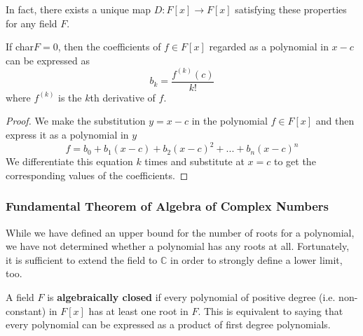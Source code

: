 \documentclass{article}
\begin{document}
      In fact, there exists a unique map $D: F[x] \longrightarrow F[x]$ satisfying these properties for any field $F$. 

      \begin{proposition}
        If char$F = 0$, then the coefficients of $f \in F[x]$ regarded as a polynomial in $x - c$ can be expressed as 
        \begin{equation}
          b_k = \frac{ f^{(k)} (c)}{k!}
        \end{equation}
        where $f^{(k)}$ is the $k$th derivative of $f$. 
      \end{proposition}
      \begin{proof}
        We make the substitution $ y = x-c$ in the polynomial $f \in F[x]$ and then express it as a polynomial in $y$ 
        \begin{equation}
          f = b_0 + b_1 (x-c) + b_2 (x-c)^2 + ... + b_n (x-c)^n
        \end{equation}
        We differentiate this equation $k$ times and substitute at $x = c$ to get the corresponding values of the coefficients.
      \end{proof}

    \subsubsection{Fundamental Theorem of Algebra of Complex Numbers}

      While we have defined an upper bound for the number of roots for a polynomial, we have not determined whether a polynomial has any roots at all. Fortunately, it is sufficient to extend the field to $\mathbb{C}$ in order to strongly define a lower limit, too. 

      \begin{definition}
        A field $F$ is \textbf{algebraically closed} if every polynomial of positive degree (i.e. non-constant) in $F[x]$ has at least one root in $F$. This is equivalent to saying that every polynomial can be expressed as a product of first degree polynomials.
      \end{definition}
\end{document}
